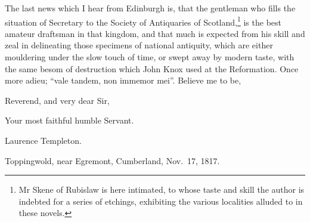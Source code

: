 The last news which I hear from Edinburgh is, that the gentleman who
fills the situation of Secretary to the Society of Antiquaries of
Scotland,\footnote{Mr Skene of Rubislaw is here intimated, to whose taste
and skill the author is indebted for a series of etchings, exhibiting
the various localities alluded to in these novels.} is the best amateur
draftsman in that kingdom, and
that much is expected from his skill and zeal in delineating those
specimens of national antiquity, which are either mouldering under the
slow touch of time, or swept away by modern taste, with the same besom
of destruction which John Knox used at the Reformation. Once more adieu;
``vale tandem, non immemor mei''. Believe me to be,

\noindent Reverend, and very dear Sir,

\noindent Your most faithful humble Servant.

\noindent Laurence Templeton.

\noindent Toppingwold, near Egremont, Cumberland, Nov.~17, 1817.
